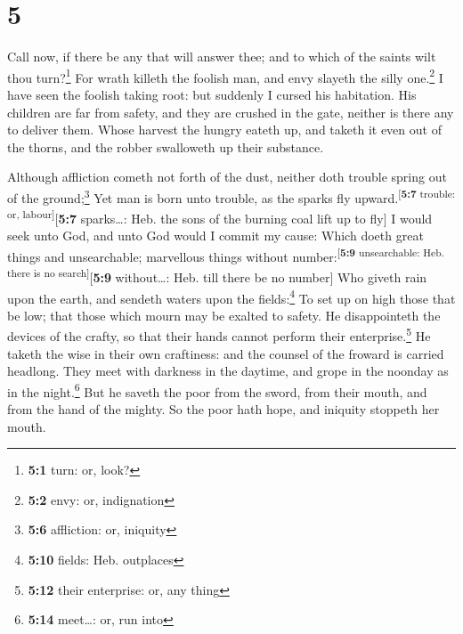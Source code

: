 \hypertarget{section-4}{%
\section{5}\label{section-4}}

 Call now, if there be any that will answer thee; and to
which of the saints wilt thou turn?\footnote{\textbf{5:1} turn: or,
  look?}  For wrath killeth the foolish man, and envy
slayeth the silly one.\footnote{\textbf{5:2} envy: or, indignation}
 I have seen the foolish taking root: but suddenly I
cursed his habitation.  His children are far from safety,
and they are crushed in the gate, neither is there any to deliver them.
 Whose harvest the hungry eateth up, and taketh it even
out of the thorns, and the robber swalloweth up their substance.

 Although affliction cometh not forth of the dust, neither
doth trouble spring out of the ground;\footnote{\textbf{5:6} affliction:
  or, iniquity}  Yet man is born unto trouble, as the
sparks fly upward.\textsuperscript{{[}\textbf{5:7} trouble: or,
labour{]}}{[}\textbf{5:7} sparks\ldots: Heb. the sons of the burning
coal lift up to fly{]}  I would seek unto God, and unto
God would I commit my cause:  Which doeth great things and
unsearchable; marvellous things without
number:\textsuperscript{{[}\textbf{5:9} unsearchable: Heb. there is no
search{]}}{[}\textbf{5:9} without\ldots: Heb. till there be no number{]}
 Who giveth rain upon the earth, and sendeth waters upon
the fields:\footnote{\textbf{5:10} fields: Heb. outplaces}
 To set up on high those that be low; that those which
mourn may be exalted to safety.  He disappointeth the
devices of the crafty, so that their hands cannot perform their
enterprise.\footnote{\textbf{5:12} their enterprise: or, any thing}
 He taketh the wise in their own craftiness: and the
counsel of the froward is carried headlong.  They meet
with darkness in the daytime, and grope in the noonday as in the
night.\footnote{\textbf{5:14} meet\ldots: or, run into} 
But he saveth the poor from the sword, from their mouth, and from the
hand of the mighty.  So the poor hath hope, and iniquity
stoppeth her mouth.

